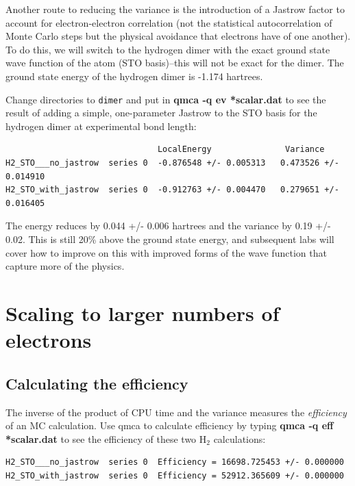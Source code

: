 Another route to reducing the variance is the introduction of a Jastrow factor to 
account for electron-electron correlation (not the statistical autocorrelation
of Monte Carlo steps but the physical avoidance that electrons have of one another).
To do this, we will switch to the hydrogen dimer with the exact ground state
wave function of the atom (STO basis)--this will not be exact for the dimer.
The ground state energy of the hydrogen dimer is -1.174 hartrees.

Change directories to \texttt{dimer} and put in \textbf{qmca -q ev *scalar.dat}
to see the result of adding a simple, one-parameter Jastrow to the STO basis
for the hydrogen dimer at experimental bond length:

\begin{shaded}
\begin{verbatim}
                               LocalEnergy               Variance           
H2_STO___no_jastrow  series 0  -0.876548 +/- 0.005313   0.473526 +/- 0.014910
H2_STO_with_jastrow  series 0  -0.912763 +/- 0.004470   0.279651 +/- 0.016405
\end{verbatim}
\end{shaded}

The energy reduces by 0.044 +/- 0.006 hartrees and the variance by 0.19 +/- 0.02.
This is still 20\% above the ground state energy, and subsequent labs will cover how
to improve on this with improved forms of the wave function that capture more
of the physics.

\section{Scaling to larger numbers of electrons}

\subsection{Calculating the efficiency}

The inverse of the product of CPU time and the variance measures the
\textit{efficiency} of an MC calculation.  Use qmca to calculate efficiency by
typing \textbf{qmca -q eff *scalar.dat} to see the efficiency of these two
H$_2$ calculations:

\begin{shaded}
\begin{verbatim}
H2_STO___no_jastrow  series 0  Efficiency = 16698.725453 +/- 0.000000 
H2_STO_with_jastrow  series 0  Efficiency = 52912.365609 +/- 0.000000 
\end{verbatim}
\end{shaded}

